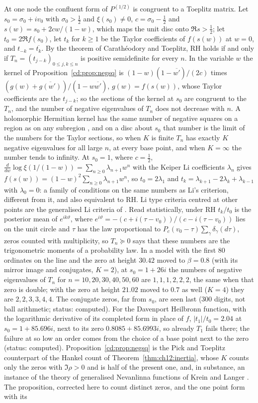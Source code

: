 At one node the confluent form of $P^{(1/2)}$ is congruent to a Toeplitz matrix. Let $s_0=\sigma_0+iv_0$ with $\sigma_0>\tfrac12$ and $\xi(s_0)\ne0$, $c=\sigma_0-\tfrac12$ and $s(w)=s_0+2cw/(1-w)$, which maps the unit disc onto $\Re s>\tfrac12$; let $t_0=2\Re f(s_0)$, let $t_k$ for $k\ge1$ be the Taylor coefficients of $f(s(w))$ at $w=0$, and $t_{-k}=\overline{t_k}$. By the theorem of Carath\'eodory and Toeplitz, RH holds if and only if $T_n=(t_{j-k})_{0\le j,k\le n}$ is positive semidefinite for every $n$. In the variable $w$ the kernel of Proposition~\ref{cd:prop:negsq} is $(1-w)(1-\overline{w'})/(2c)$ times $(g(w)+\overline{g(w')})/(1-w\overline{w'})$, $g(w)=f(s(w))$, whose Taylor coefficients are the $t_{j-k}$; so the sections of the kernel at $s_0$ are congruent to the $T_n$, and the number of negative eigenvalues of $T_n$ does not decrease with $n$. A holomorphic Hermitian kernel has the same number of negative squares on a region as on any subregion \cite[Theorem~3.7]{ADRS98}, and on a disc about $s_0$ that number is the limit of the numbers for the Taylor sections, so when $K$ is finite $T_n$ has exactly $K$ negative eigenvalues for all large $n$, at every base point, and when $K=\infty$ the number tends to infinity. At $s_0=1$, where $c=\tfrac12$, $\frac{d}{dw}\log\xi(1/(1-w))=\sum_{n\ge0}\lambda_{n+1}w^n$ with the Keiper Li coefficients $\lambda_n$ \cite{BL99} gives $f(s(w))=(1-w)^2\sum_{n\ge0}\lambda_{n+1}w^n$, so $t_0=2\lambda_1$ and $t_k=\lambda_{k+1}-2\lambda_k+\lambda_{k-1}$ with $\lambda_0=0$: a family of conditions on the same numbers as Li's criterion, different from it, and also equivalent to RH. Li type criteria centred at other points are the generalised Li criteria of \cite{Sekatskii14}. Read statistically, under RH $t_k/t_0$ is the posterior mean of $e^{ik\vartheta}$, where $e^{i\vartheta}=-(c+i(\tau-v_0))/(c-i(\tau-v_0))$ lies on the unit circle and $\tau$ has the law proportional to $P_c(v_0-\tau)\sum_\gamma\delta_\gamma(d\tau)$, zeros counted with multiplicity, so $T_n\succeq0$ says that these numbers are the trigonometric moments of a probability law. In a model with the first $80$ ordinates on the line and the zero at height $30.42$ moved to $\beta=0.8$ (with its mirror image and conjugates, $K=2$), at $s_0=1+26i$ the numbers of negative eigenvalues of $T_n$ for $n=10,20,30,40,50,60$ are $1,1,1,2,2,2$, the same when that zero is double; with the zero at height $21.02$ moved to $0.7$ as well ($K=4$) they are $2,2,3,3,4,4$. The conjugate zeros, far from $s_0$, are seen last ($300$ digits, not ball arithmetic; status: computed). For the Davenport Heilbronn function, with the logarithmic derivative of its completed form in place of $f$, $|t_1|/t_0=2.04$ at $s_0=1+85.696i$, next to its zero $0.8085+85.6993i$, so already $T_1$ fails there; the failure at so low an order comes from the choice of a base point next to the zero (status: computed). Proposition~\ref{cd:prop:negsq} is the Pick and Toeplitz counterpart of the Hankel count of Theorem~\ref{thm:ch12:inertia}, whose $K$ counts only the zeros with $\Im\rho>0$ and is half of the present one, and, in substance, an instance of the theory of generalised Nevanlinna functions of Krein and Langer \cite{KL77}. The proposition, corrected here to count distinct zeros, and the one point form with its 